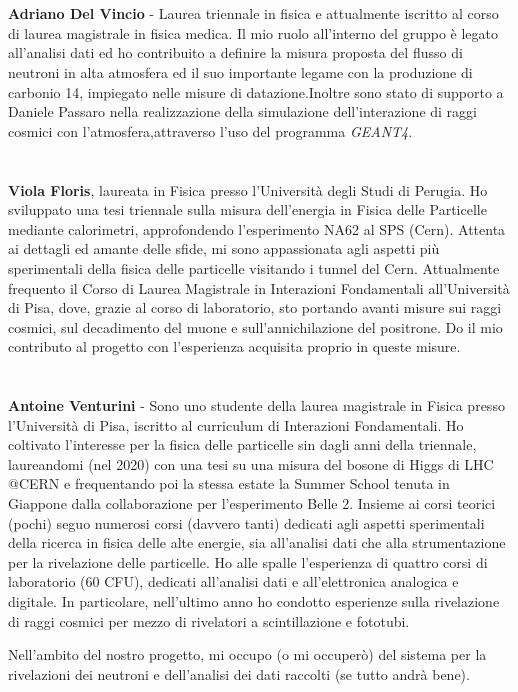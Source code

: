 \documentclass{article}
\begin{document}
\section*{}
\textbf{Adriano Del Vincio} - Laurea triennale in fisica e attualmente iscritto al corso di laurea magistrale in fisica medica. Il mio ruolo all'interno del gruppo è legato all'analisi dati ed ho contribuito a definire la misura proposta del flusso di neutroni in alta atmosfera ed il suo importante legame con la produzione di carbonio 14, impiegato nelle misure di datazione.Inoltre sono stato di supporto a Daniele Passaro nella realizzazione della simulazione dell'interazione di raggi cosmici con l'atmosfera,attraverso l'uso del programma \textit{GEANT4}. 

\section*{}
\textbf{Viola Floris}, laureata in Fisica presso l'Università degli Studi di Perugia. Ho sviluppato una tesi triennale sulla misura dell'energia in Fisica delle Particelle mediante calorimetri, approfondendo l'esperimento NA62 al SPS (Cern). Attenta ai dettagli ed amante delle sfide, mi sono appassionata agli aspetti più sperimentali della fisica delle particelle visitando i tunnel del Cern. Attualmente frequento il Corso di Laurea Magistrale in Interazioni Fondamentali all'Università di Pisa, dove, grazie al corso di laboratorio, sto portando avanti misure sui raggi cosmici, sul decadimento del muone e sull'annichilazione del positrone. Do il mio contributo al progetto con l'esperienza acquisita proprio in queste misure.

\section*{}
\textbf{Antoine Venturini} - Sono uno studente della laurea magistrale in Fisica presso l'Università di Pisa, iscritto al curriculum di Interazioni Fondamentali. Ho coltivato l'interesse per la fisica delle particelle sin dagli anni della triennale, laureandomi (nel 2020) con una tesi su una misura del bosone di Higgs di LHC @CERN e frequentando poi la stessa estate la Summer School tenuta in Giappone dalla collaborazione per l'esperimento Belle 2.  
Insieme ai corsi teorici (pochi) seguo numerosi corsi (davvero tanti) dedicati agli aspetti sperimentali della ricerca in fisica delle alte energie, sia all'analisi dati che alla strumentazione per la rivelazione delle particelle.
Ho alle spalle l'esperienza di quattro corsi di laboratorio (60 CFU), dedicati all'analisi dati e all'elettronica analogica e digitale. In particolare, nell'ultimo anno ho condotto esperienze sulla rivelazione di raggi cosmici per mezzo di rivelatori a scintillazione e fototubi. 

Nell'ambito del nostro progetto, mi occupo (o mi occuperò) del sistema per la rivelazioni dei neutroni e dell'analisi dei dati raccolti (se tutto andrà bene). 
\end{document}
